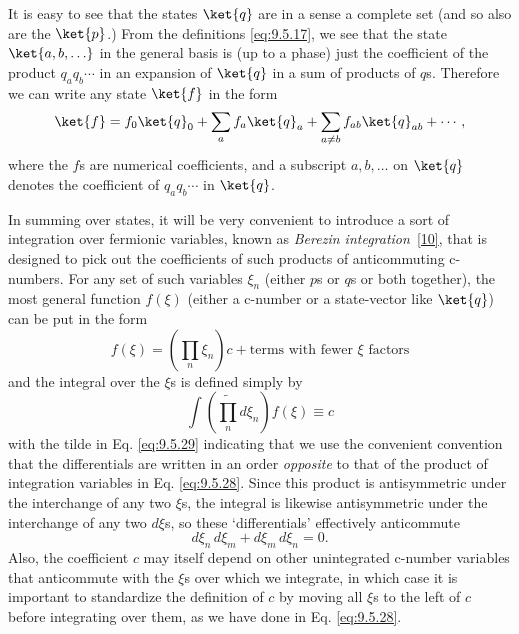 It is easy to see that the states $\ket{q}$ are in a sense a complete set (and
so also are the $\ket{p}$.) From the definitions \eqref{eq:9.5.17}, we see that the
state $\ket{a,b,\ldots}$ in the general basis is (up to a phase) just the
coefficient of the product $q_aq_b\cdots$ in an expansion of $\ket{q}$ in a
sum of products of $q$s. Therefore we can write any state $\ket{f}$ in the
form
\[
\ket{f}=f_0\ket{q}_0+\sum_a f_a\ket{q}_a
 +\sum_{a\ne b}f_{ab}\ket{q}_{ab}+\cdots,
\]
where the $f$s are numerical coefficients, and a subscript $a,b,\ldots$ on
$\ket{q}$ denotes the coefficient of $q_aq_b\cdots$ in $\ket{q}$.

In summing over states, it will be very convenient to introduce a sort of
integration over fermionic variables, known as \emph{Berezin integration}~\hyperref[ref:9.10]{[10]},
that is designed to pick out the coefficients of such products of
anticommuting c-numbers. For any set of such variables $\xi_n$ (either $p$s or
$q$s or both together), the most general function $f(\xi)$ (either a c-number
or a state-vector like $\ket{q}$) can be put in the form
\begin{equation}
f(\xi)=\left(\prod_n\xi_n\right)c
 +\text{terms with fewer $\xi$ factors}
\tag{9.5.28}\label{eq:9.5.28}
\end{equation}
and the integral over the $\xi$s is defined simply by
\begin{equation}
\int\left(\widetilde{\prod_n}d\xi_n\right)f(\xi)\equiv c
\tag{9.5.29}\label{eq:9.5.29}
\end{equation}
with the tilde in Eq. \eqref{eq:9.5.29} indicating that we use the convenient convention
that the differentials are written in an order \emph{opposite} to that of the
product of integration variables in Eq. \eqref{eq:9.5.28}. Since this product is
antisymmetric under the interchange of any two $\xi$s, the integral is
likewise antisymmetric under the interchange of any two $d\xi$s, so these
`differentials' effectively anticommute
\begin{equation}
d\xi_n\,d\xi_m+d\xi_m\,d\xi_n=0.
\tag{9.5.30}\label{eq:9.5.30}
\end{equation}
Also, the coefficient $c$ may itself depend on other unintegrated c-number
variables that anticommute with the $\xi$s over which we integrate, in which
case it is important to standardize the definition of $c$ by moving all $\xi$s
to the left of $c$ before integrating over them, as we have done in Eq.
\eqref{eq:9.5.28}.

